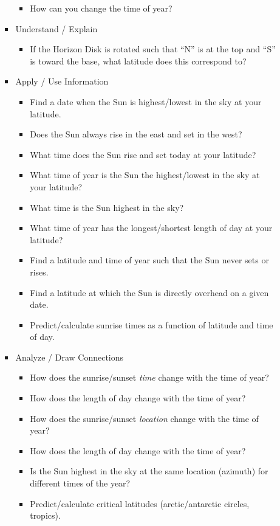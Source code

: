 \documentclass[tikz]{article}
\begin{document}
\begin{itemize}
\begin{itemize}
\begin{itemize}
\begin{itemize}
					\item How can you change the time of year? 
				\end{itemize}
				\item Understand / Explain
				\begin{itemize}
					\item If the Horizon Disk is rotated such that ``N'' is at the top and ``S'' is toward the base, what latitude does this correspond to? 
				\end{itemize}
				\item Apply / Use Information
				\begin{itemize}
					\item Find a date when the Sun is highest/lowest in the sky at your latitude.
					\item Does the Sun always rise in the east and set in the west? 
					\item What time does the Sun rise and set today at your latitude?
					\item What time of year is the Sun the highest/lowest in the sky at your latitude?
					\item What time is the Sun highest in the sky? 
					\item What time of year has the longest/shortest length of day at your latitude?
					\item Find a latitude and time of year such that the Sun never sets or rises.
					\item Find a latitude at which the Sun is directly overhead on a given date.
					\item Predict/calculate sunrise times as a function of latitude and time of day. 
				\end{itemize}
				\item Analyze / Draw Connections
				\begin{itemize}
					\item How does the sunrise/sunset \emph{time} change with the time of year? 
					\item How does the length of day change with the time of year? 
					\item How does the sunrise/sunset \emph{location} change with the time of year? 
					\item How does the length of day change with the time of year? 
					\item Is the Sun highest in the sky at the same location (azimuth) for different times of the year? {\color{red}{(Reword)}}
					\item Predict/calculate critical latitudes (arctic/antarctic circles, tropics).

\end{itemize}
\end{itemize}
\end{itemize}
\end{itemize}
\end{document}
